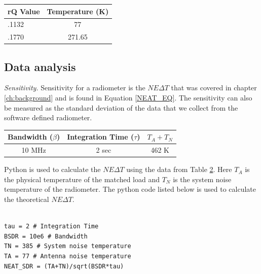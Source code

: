 \begin{table}[h!tb] \centering
{}
\label{exp2_datapoints}
\begin{tabular}{lc} \hline
\textbf{rQ Value} & \textbf{Temperature (K)} \\ \hline
.1132 & 77 \\
.1770 & 271.65 \\ \hline
\end{tabular}
\end{table}
 
\subsection{Data analysis}\label{Exp2_analysis}

\emph{Sensitivity.}  Sensitivity for a radiometer is the $NE\Delta T$ that was covered in chapter \ref{ch:background} and is found in Equation \ref{NEAT_EQ}.  The sensitivity can also be measured as the standard deviation of the data that we collect from the software defined radiometer.  

\begin{table}[h!tb] \centering
{}
\label{exp2_param}
\begin{tabular}{ccc} \hline
\textbf{Bandwidth ($\beta$)} & \textbf{Integration Time ($\tau$)} & \textbf{$T_{A}+T_{N}$}\\ \hline
10 MHz & 2 sec & 462 K \\ \hline
\end{tabular}
\end{table}

Python is used to calculate the $NE\Delta T$ using the data from Table \ref{exp2_param}.  Here $T_A$ is the physical temperature of the matched load and $T_N$ is the system noise temperature of the radiometer.  The python code listed below is used to calculate the theoretical $NE\Delta T$.
\ \\ \ \\
\begin{minipage}{\linewidth}
\begin{lstlisting}[frame=single,keywordstyle=\color{blue}]
tau = 2 # Integration Time
BSDR = 10e6 # Bandwidth
TN = 385 # System noise temperature
TA = 77 # Antenna noise temperature
NEAT_SDR = (TA+TN)/sqrt(BSDR*tau)
\end{lstlisting}
\end{minipage}

